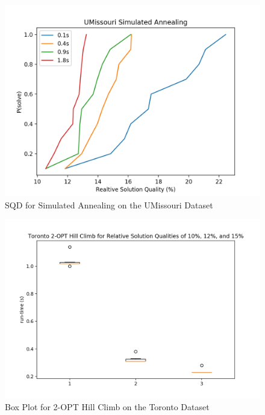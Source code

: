 \documentclass[format=sigconf]{acmart}
\begin{document}
\begin{figure}[htbp]
    \centerline{\includegraphics[scale=.5]{graphs/UMissouri_LS2_SQD.png}}
    \caption{SQD for Simulated Annealing on the UMissouri Dataset}
    \label{fig8}
\end{figure}

\begin{figure}[htbp]
    \centerline{\includegraphics[scale=.5]{graphs/Toronto_LS1_Box.png}}
    \caption{Box Plot for 2-OPT Hill Climb on the Toronto Dataset}
    \label{fig9}
\end{figure}
\end{document}
